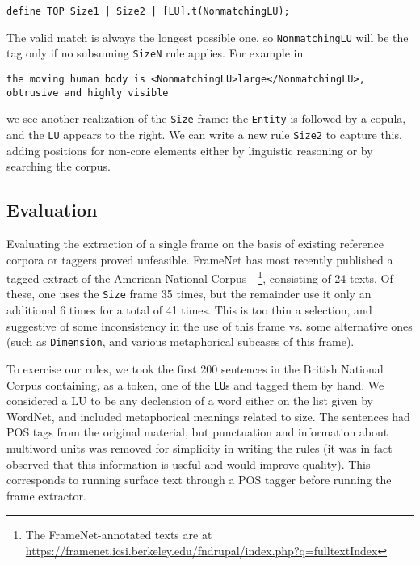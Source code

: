 \documentclass{llncs}
\begin{document}
\begin{center}
  \small
  \begin{framed}
\begin{verbatim}
define TOP Size1 | Size2 | [LU].t(NonmatchingLU);
\end{verbatim}
  \end{framed}
\end{center}
\normalsize

The valid match is always the longest possible one, so \verb+NonmatchingLU+ will be the tag only if no subsuming \verb+SizeN+ rule applies.
For example in

\begin{center}
\small
\begin{framed}
\begin{verbatim}
the moving human body is <NonmatchingLU>large</NonmatchingLU>,
obtrusive and highly visible
\end{verbatim}
\end{framed}
\end{center}
\normalsize

\noindent we see another realization of the \verb+Size+ frame: the \verb+Entity+ is followed by a
copula, and the \verb+LU+ appears to the right. We can write a new rule
\verb+Size2+ to capture this, adding positions for non-core elements either by
linguistic reasoning or by searching the corpus.

\subsection{Evaluation}

Evaluating the extraction of a single frame on the basis of existing reference
corpora or taggers proved unfeasible. FrameNet has most recently published a
tagged extract of the American National
Corpus~\cite{anc}~\footnote{The FrameNet-annotated texts are at\\\url{https://framenet.icsi.berkeley.edu/fndrupal/index.php?q=fulltextIndex}},
consisting of 24 texts. Of these, one uses the \verb+Size+ frame 35 times, but the remainder use it only an additional 6 times
for a total of 41 times. This is too thin a selection, and suggestive of some inconsistency in the use of this frame vs.\@
some alternative ones (such as \verb+Dimension+, and various metaphorical subcases of this frame).

To exercise our rules, we took the first 200 sentences in the British National
Corpus containing, as a token, one of the \verb+LU+s and tagged them by hand.
We considered a LU to be any declension of a word either on the list given by WordNet,
and included metaphorical meanings related to size.
The sentences had POS tags from the original material, but punctuation
and information about multiword units was removed for simplicity in writing
the rules (it was in fact observed that this information is useful and would improve
quality). This corresponds to running surface text through a POS tagger before
running the frame extractor.
\end{document}

